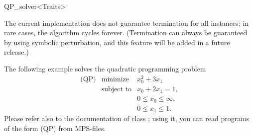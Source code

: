 \begin{ccRefClass}{QP_solver<Traits>}
\begin{ccIndexMemberFunctions}



\end{ccIndexMemberFunctions}


\ccSeeAlso
%

\ccImplementation
\ccIndexImplementation

The current implementation does not guarantee termination for all
instances; in rare cases, the algorithm cycles forever.  (Termination
can always be guaranteed by using symbolic perturbation, and this
feature will be added in a future release.)

\ccExample

The following example solves the quadratic programming problem
\begin{eqnarray*}
\mbox{(QP)}&\mbox{minimize} & x_0^2 + 3x_1 \\
&\mbox{subject to}   & x_0+2x_1=1, \\
&& 0 \le  x_0 \le \infty, \\
&& 0 \le  x_1 \le 1.
\end{eqnarray*}
Please refer also to the documentation of class
; using it, you can read programs of
the form (QP) from MPS-files.
\end{ccRefClass}


